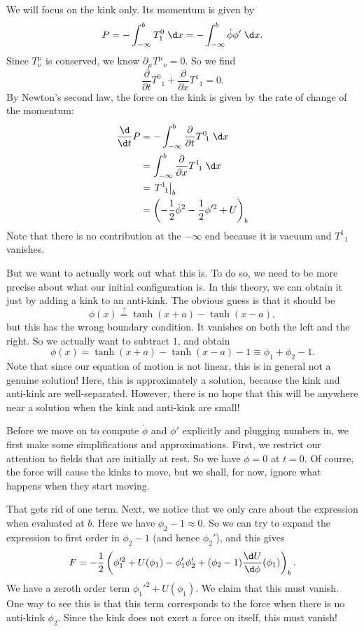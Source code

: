 \documentclass[a4paper]{article}
\begin{document}
We will focus on the kink only. Its momentum is given by
\[
  P = - \int_{-\infty}^b T^0_1 \;\d x = - \int_{-\infty}^b \dot{\phi} \phi' \;\d x.
\]
Since $T^\mu_\nu$ is conserved, we know $\partial_\mu T^\mu\!_\nu = 0$. So we find
\[
  \frac{\partial}{\partial t} T^0\!_1 + \frac{\partial}{\partial x}T^1\!_1 = 0.
\]
By Newton's second law, the force on the kink is given by the rate of change of the momentum:
\begin{align*}
  \frac{\d}{\d t} P &= -\int_{-\infty}^b \frac{\partial}{\partial t} T^0\!_1\;\d x \\
  &= \int_{-\infty}^b \frac{\partial}{\partial x} T^1\!_1\;\d x\\
  &= \left.T^1\!_1\right|_b\\
  &= \left(-\frac{1}{2} \dot{\phi}^2 - \frac{1}{2} \phi'^2 + U\right)_b
\end{align*}
Note that there is no contribution at the $-\infty$ end because it is vacuum and $T^1\!_1$ vanishes.

But we want to actually work out what this is. To do so, we need to be more precise about what our initial configuration is. In this theory, we can obtain it just by adding a kink to an anti-kink. The obvious guess is that it should be
\[
  \phi(x) \overset{?}{=} \tanh(x + a) - \tanh(x - a),
\]
but this has the wrong boundary condition. It vanishes on both the left and the right. So we actually want to subtract $1$, and obtain
\[
  \phi(x) = \tanh(x + a) - \tanh(x - a) - 1 \equiv \phi_1 + \phi_2 - 1.
\]
Note that since our equation of motion is not linear, this is in general not a genuine solution! Here, this is approximately a solution, because the kink and anti-kink are well-separated. However, there is no hope that this will be anywhere near a solution when the kink and anti-kink are small!

Before we move on to compute $\dot{\phi}$ and $\phi'$ explicitly and plugging numbers in, we first make some simplifications and approximations. First, we restrict our attention to fields that are initially at rest. So we have $\dot{\phi} = 0$ at $t = 0$. Of course, the force will cause the kinks to move, but we shall, for now, ignore what happens when they start moving.

That gets rid of one term. Next, we notice that we only care about the expression when evaluated at $b$. Here we have $\phi_2 - 1 \approx 0$. So we can try to expand the expression to first order in $\phi_2 - 1$ (and hence $\phi_2'$), and this gives
\[
  F = -\frac{1}{2} \left(\phi_1'^2 + U(\phi_1) - \phi_1' \phi_2' + (\phi_2 - 1) \frac{\d U}{\d \phi}(\phi_1)\right)_b.
\]
We have a zeroth order term $\phi_1'^2 + U(\phi_1)$. We claim that this must vanish. One way to see this is that this term corresponds to the force when there is no anti-kink $\phi_2$. Since the kink does not exert a force on itself, this must vanish!
\end{document}
